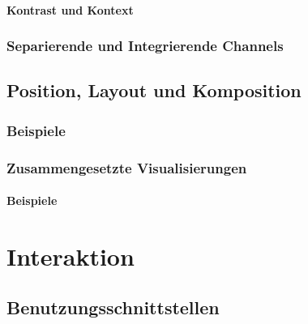                 \paragraph{Kontrast und Kontext} %

            \subsubsection{Separierende und Integrierende Channels} %

        \subsection{Position, Layout und Komposition} %

            \subsubsection{Beispiele} %

            \subsubsection{Zusammengesetzte Visualisierungen} %

                \paragraph{Beispiele} %

    \section{Interaktion} %

        \subsection{Benutzungsschnittstellen} %

